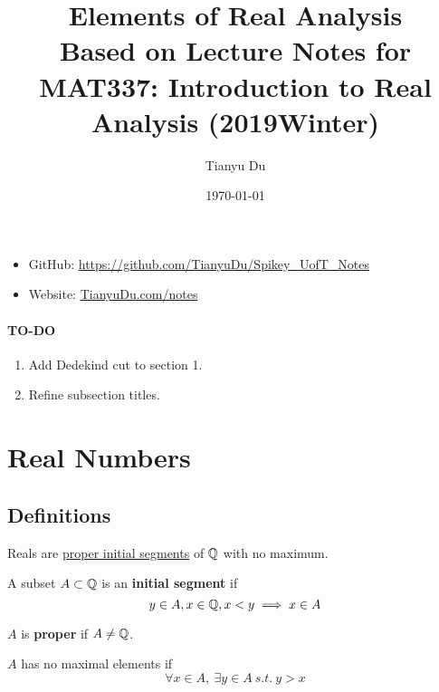 \documentclass[11pt]{article}
\title{Elements of Real Analysis \\ \small Based on Lecture Notes for MAT337: Introduction to Real Analysis (2019Winter)}
\date{\today}
\author{Tianyu Du}
\begin{document}
	\maketitle
	\doclicenseThis
	\begin{itemize}
		\item GitHub: \url{https://github.com/TianyuDu/Spikey_UofT_Notes}
		\item Website: \url{TianyuDu.com/notes}
	\end{itemize}
        \paragraph{TO-DO}
	    \begin{enumerate}
	        \item Add Dedekind cut to section 1.
	        \item Refine subsection titles.
	    \end{enumerate}
	\tableofcontents
	\newpage
	
    \section{Real Numbers}
        \subsection{Definitions}
        \begin{definition}
            Reals are \ul{proper initial segments} of $\mathbb{Q}$ with no maximum.
        \end{definition}
    
        \begin{definition}
            A subset $A \subset \mathbb{Q}$ is an \textbf{initial segment} if 
            \begin{equation}
                y \in A, x \in \mathbb{Q}, x < y \implies x \in A
            \end{equation}
        \end{definition}
	   
        \begin{definition}
            $A$ is \textbf{proper} if $A \neq \mathbb{Q}$.
        \end{definition}
        
        \begin{definition}
            $A$ has no maximal elements if 
            \begin{equation}
                \forall x \in A,\ \exists y \in A\ s.t.\ y > x
            \end{equation}
        \end{definition}
        
\end{document}
